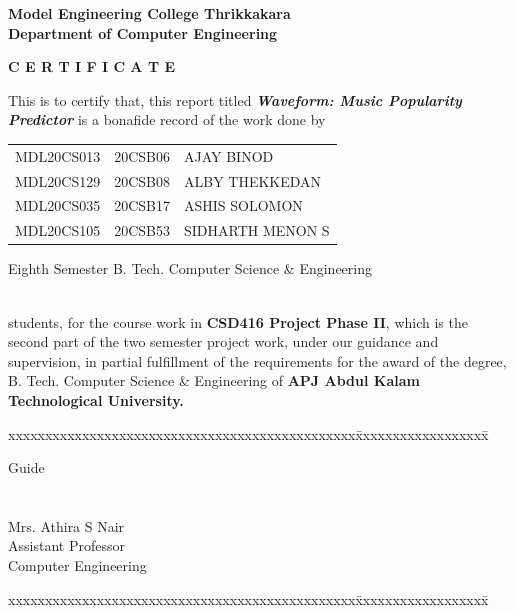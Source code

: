 \documentclass[11pt]{report}
\begin{document}
\begin{titlepage}
\begin{center}
\Large{\textbf{Model Engineering College Thrikkakara}}\\
\Large{\textbf{Department of Computer Engineering}}\\
\end{center}
\begin{figure}[h]
\begin{center}
\end{center}
\end{figure}
\begin{center}
\Large{\textbf{C E R T I F I C A T E}}\\
\vspace{.1in}
\end{center}
This is to certify that, this report titled \textbf{\textit{ Waveform: Music Popularity Predictor}} is a bonafide record of the work done by\\
\begin{center}
\begin{tabular}{lll}
      MDL20CS013 &   20CSB06  & AJAY BINOD \\
    MDL20CS129 & 20CSB08 & ALBY THEKKEDAN\\
     MDL20CS035 & 20CSB17 & ASHIS SOLOMON \\
     MDL20CS105 & 20CSB53 & SIDHARTH MENON S \\
\end{tabular}
\end{center}
\centerline {\textsf{Eighth Semester B. Tech. Computer Science \& Engineering}}\\
students,  for the course work in \textbf{CSD416 Project Phase II}, which is the second part of the two semester project work, under our guidance and supervision, in partial fulfillment of the requirements for the award of the degree, B. Tech. Computer 
Science \& Engineering of \textbf{APJ Abdul Kalam Technological University. }
\vspace{.1in}
\begin{tabbing}
xxxxxxxxxxxxxxxxxxxxxxxxxxxxxxxxxxxxxxxxxxxxxxx\= xxxxxxxxxxxxxxxxxx\= \kill

Guide		\>				
\\
\\
\\
Mrs. Athira S Nair \>\>\\
Assistant Professor	\>\>\\
Computer Engineering	\>\>	
\end{tabbing}
\vspace{.1in}
\begin{tabbing}
xxxxxxxxxxxxxxxxxxxxxxxxxxxxxxxxxxxxxxxxxxxxxxx\= xxxxxxxxxxxxxxxxxx\= \kill


\end{tabbing}
\end{titlepage}
\end{document}
